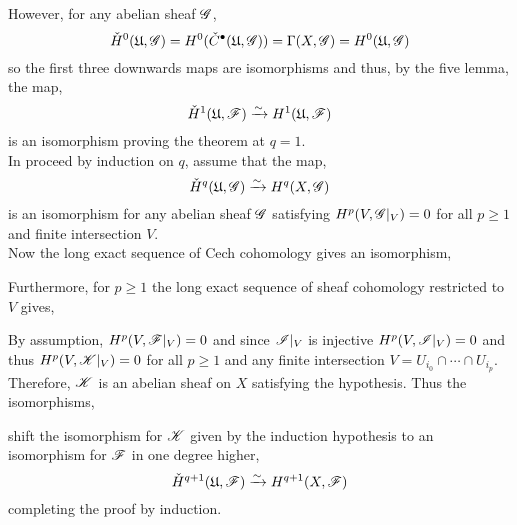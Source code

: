 \documentclass[12pt]{article}
\begin{document}
\begin{center}
\end{center}
However, for any abelian sheaf $\mathscr{G}$,
\[ \check{H}^0(\mathfrak{U}, \mathscr{G}) = H^0(\check{C}^\bullet(\mathfrak{U}, \mathscr{G})) = \Gamma(X, \mathscr{G}) = H^0(\mathfrak{U}, \mathscr{G}) \]
so the first three downwards maps are isomorphisms and thus, by the five lemma, the map,
\[ \check{H}^1(\mathfrak{U}, \mathscr{F}) \xrightarrow{\sim} H^1(\mathfrak{U}, \mathscr{F}) \]
is an isomorphism proving the theorem at $q = 1$. 
\bigskip\\
In proceed by induction on $q$, assume that the map,
\[ \check{H}^q(\mathfrak{U}, \mathscr{G}) \xrightarrow{\sim} H^q(X, \mathscr{G}) \]
is an isomorphism for any abelian sheaf $\mathscr{G}$ satisfying $H^p(V, \mathscr{G}|_V) = 0$ for all $p \ge 1$ and finite intersection $V$. 
\bigskip\\
Now the long exact sequence of Cech cohomology gives an isomorphism,
\begin{center}
\end{center}
Furthermore, for $p \ge 1$ the long exact sequence of sheaf cohomology restricted to $V$ gives,
\begin{center}
\end{center}
By assumption, $H^p(V, \mathscr{F}|_V) = 0$ and since $\mathscr{I}|_V$ is injective $H^p(V, \mathscr{I}|_V) = 0$ and thus $H^p(V, \mathscr{K}|_V) = 0$ for all $p \ge 1$ and any finite intersection $V = U_{i_0} \cap \cdots \cap U_{i_p}$. Therefore, $\mathscr{K}$ is an abelian sheaf on $X$ satisfying the hypothesis. Thus the isomorphisms,
\begin{center}
\end{center}
shift the isomorphism for $\mathscr{K}$ given by the induction hypothesis to an isomorphism for $\mathscr{F}$ in one degree higher,
\[ \check{H}^{q+1}(\mathfrak{U}, \mathscr{F}) \xrightarrow{\sim} H^{q+1}(X, \mathscr{F}) \]
completing the proof by induction.
\end{document}
